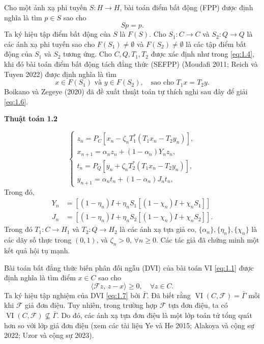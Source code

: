 \documentclass{MyBook}
\theoremstyle{plain}
\theoremstyle{definition}
\theoremstyle{remark}
\numberwithin{equation}{chapter}
\newcommand{\Fc}{\mathcal{F}}
\newcommand{\inp}[2]{\langle #1,\,#2\rangle}
\DeclareMathOperator{\VI}{VI}
\newcommand{\Gam}{\bar{\Gamma}}
\newcommand{\Fix}[1]{F(#1)}
\newenvironment{algobox}[1]
  {\par\medskip\noindent\textbf{#1}\par\vspace{-2pt}\noindent\hrulefill\par\nopagebreak\vspace{2pt}}
  {\par\noindent\hrulefill\par\medskip}
\begin{document}
Cho một ánh xạ phi tuyến $S:H\to H$, bài toán điểm bất động (FPP) được định nghĩa là tìm $p\in S$ sao cho
\[
Sp=p.
\]
Ta ký hiệu tập điểm bất động của $S$ là $\Fix{S}$. Cho $S_1:C\to C$ và $S_2:Q\to Q$ là các ánh xạ phi tuyến sao cho $\Fix{S_1}\ne\emptyset$ và $\Fix{S_2}\ne\emptyset$ là các tập điểm bất động của $S_1$ và $S_2$ tương ứng. Cho $C,Q,T_1,T_2$ được xác định như trong \eqref{eq:1.4}, khi đó bài toán điểm bất động tách đẳng thức (SEFPP) (Moudafi 2011; Reich và Tuyen 2022) được định nghĩa là tìm
\begin{equation}
x\in \Fix{S_1} \text{ và } y\in \Fix{S_2},\quad \text{sao cho } T_1x=T_2y. \label{eq:1.6}
\end{equation}
Boikano và Zegeye (2020) đã đề xuất thuật toán tự thích nghi sau đây để giải \eqref{eq:1.6}.

\begin{algobox}{Thuật toán 1.2}
\[
\begin{cases}
z_n=P_C[x_n-\zeta_n T_1^{*}(T_1x_n-T_2y_n)],\\
x_{n+1}=\alpha_n z_n+(1-\alpha_n)Y_n z_n,\\
t_n=P_Q[y_n+\zeta_n T_2^{*}(T_1x_n-T_2y_n)],\\
y_{n+1}=\alpha_n t_n+(1-\alpha_n)J_n t_n,
\end{cases}
\]
Trong đó,
\begin{align*}
Y_n &= [(1-\eta_n)I+\eta_n S_1[(1-\chi_n)I+\chi_n S_1]]\\
J_n &= [(1-\eta_n)I+\eta_n S_2[(1-\chi_n)I+\chi_n S_2]].
\end{align*}
Trong đó $T_1:C\to H_1$ và $T_2:Q\to H_2$ là các ánh xạ tựa giả co, $\{\alpha_n\},\{\eta_n\},\{\chi_n\}$ là các dãy số thực trong $(0,1)$, và $\zeta_n>0$, $\forall n\ge 0$. Các tác giả đã chứng minh một kết quả hội tụ mạnh.
\end{algobox}

Bài toán bất đẳng thức biến phân đối ngẫu (DVI) của bài toán VI \eqref{eq:1.1} được định nghĩa là tìm điểm $x\in C$ sao cho
\begin{equation}
\inp{\Fc z}{z-x}\ge 0,\quad\forall z\in C. \label{eq:1.7}
\end{equation}
Ta ký hiệu tập nghiệm của DVI \eqref{eq:1.7} bởi $\Gam$. Đã biết rằng $\VI(C,\Fc)=\Gam$ mỗi khi $\Fc$ giả đơn điệu. Tuy nhiên, trong trường hợp $\Fc$ tựa đơn điệu, ta có $\VI(C,\Fc)\not\subseteq\Gam$. Do đó, các ánh xạ tựa đơn điệu là một lớp toán tử tổng quát hơn so với lớp giả đơn điệu (xem các tài liệu Ye và He 2015; Alakoya và cộng sự 2022; Uzor và cộng sự 2023).
\end{document}
